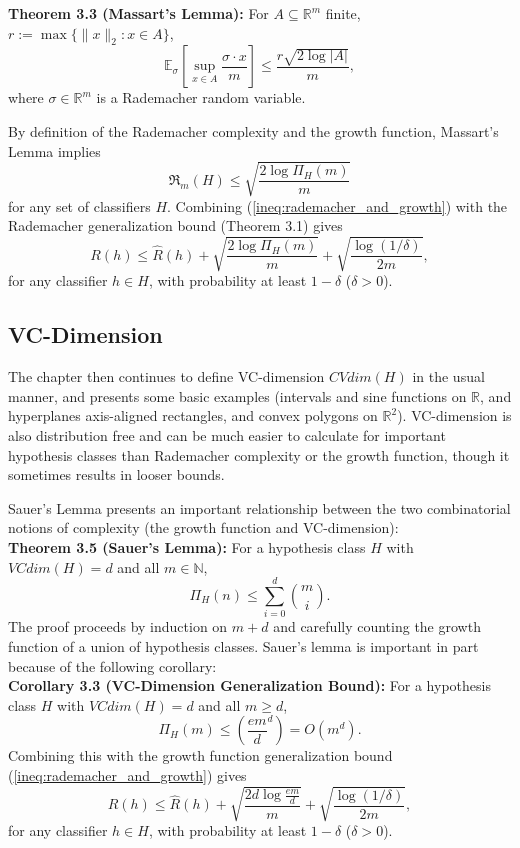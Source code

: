 \documentclass{article} %
\newcommand{\N}{\mathbb{N}}                         %
\newcommand{\R}{\mathbb{R}}                         %
\newcommand{\E}{\mathbb{E}}                         %
\renewcommand{\hat}{\widehat}
\newcommand{\Rc}{\mathfrak{R}}
\begin{document}
{\bf Theorem 3.3 (Massart's Lemma):} For $A \subseteq \R^m$ finite,
$r := \max \{\|x\|_2 : x \in A\}$,
\[\E_\sigma \left[ \sup_{x \in A} \frac{\sigma \cdot x}{m} \right]
    \leq \frac{r\sqrt{2 \log |A|}}{m},\]
where $\sigma \in \R^m$ is a Rademacher random variable.

By definition of the Rademacher complexity and the growth function, Massart's
Lemma implies
\begin{equation}
\Rc_m(H) \leq \sqrt{\frac{2 \log \Pi_H(m)}{m}}
\label{ineq:rademacher_and_growth}
\end{equation}
for any set of classifiers $H$. Combining (\ref{ineq:rademacher_and_growth})
with the Rademacher generalization bound (Theorem 3.1) gives
\begin{equation}
R(h) \leq \hat R(h) + \sqrt{\frac{2 \log \Pi_H(m)}{m}}
                    + \sqrt{\frac{\log (1/\delta)}{2m}},
\label{ineq:growth_gen_bound}
\end{equation}
for any classifier $h \in H$, with probability at least $1 - \delta$
($\delta > 0$).

\subsection{VC-Dimension}
The chapter then continues to define VC-dimension $CVdim(H)$ in the usual
manner, and presents some basic examples (intervals and sine functions on $\R$,
and hyperplanes axis-aligned rectangles, and convex polygons on $\R^2$).
VC-dimension is also distribution free and can be much easier to calculate for
important hypothesis classes than Rademacher complexity or the growth function,
though it sometimes results in looser bounds.

Sauer's Lemma presents an important relationship between the two combinatorial
notions of complexity (the growth function and VC-dimension): \\

{\bf Theorem 3.5 (Sauer's Lemma):} For a hypothesis class $H$ with
$VCdim(H) = d$ and all $m \in \N$,
\[\Pi_H(n) \leq \sum_{i = 0}^d \binom{m}{i}.\]
The proof proceeds by induction on $m + d$ and carefully counting the growth
function of a union of hypothesis classes. Sauer's lemma is important in part
because of the following corollary: \\

{\bf Corollary 3.3 (VC-Dimension Generalization Bound):} For a hypothesis class
$H$ with $VCdim(H) = d$ and all $m \geq d$,
\[\Pi_H(m) \leq \left( \frac{em}{d}^d \right) = O(m^d).\]
Combining this with the growth function generalization bound
(\ref{ineq:rademacher_and_growth}) gives
\begin{equation}
R(h) \leq \hat R(h) + \sqrt{\frac{2 d \log \frac{em}{d}}{m}}
                    + \sqrt{\frac{\log (1/\delta)}{2m}},
\label{ineq:growth_gen_bound2}
\end{equation}
for any classifier $h \in H$, with probability at least $1 - \delta$
($\delta > 0$). \\
\end{document}
